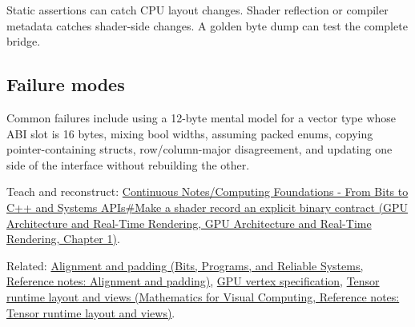 Static assertions can catch CPU layout changes. Shader reflection or compiler metadata catches shader-side changes. A golden byte dump can test the complete bridge.

\subsection{Failure modes}\label{appendix-749048795dbb-failure-modes}

Common failures include using a 12-byte mental model for a vector type whose ABI slot is 16 bytes, mixing bool widths, assuming packed enums, copying pointer-containing structs, row/column-major disagreement, and updating one side of the interface without rebuilding the other.

Teach and reconstruct: \href{../06-GPU-Architecture-and-Real-Time-Rendering/main.pdf\#nameddest=01-foundations-i-ch008-make-a-shader-record-an-explicit-binary-contract}{Continuous Notes/Computing Foundations - From Bits to C++ and Systems APIs\#Make a shader record an explicit binary contract (GPU Architecture and Real-Time Rendering, GPU Architecture and Real-Time Rendering, Chapter 1)}.

Related: \href{../01-Bits-Programs-and-Reliable-Systems/main.pdf\#nameddest=appendix-a1f7c53b4742}{Alignment and padding (Bits, Programs, and Reliable Systems, Reference notes: Alignment and padding)}, \hyperref[appendix-749ba51a6c25]{GPU vertex specification}, \href{../02-Mathematics-for-Visual-Computing/main.pdf\#nameddest=appendix-cebadf3106d1}{Tensor runtime layout and views (Mathematics for Visual Computing, Reference notes: Tensor runtime layout and views)}.

